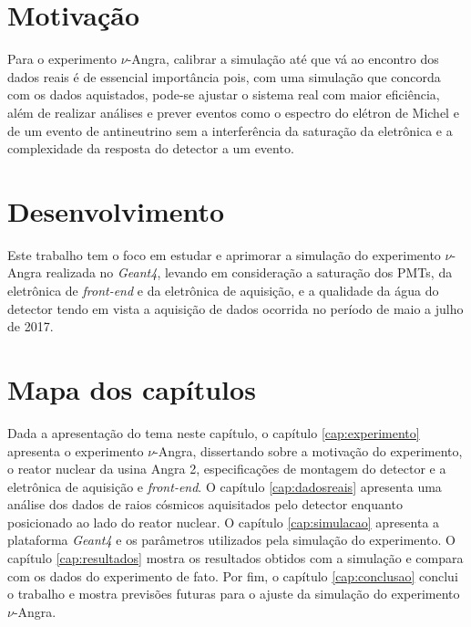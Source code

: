 \section{Motivação} 

Para o experimento $\nu$-Angra, calibrar a simulação até que vá ao encontro dos dados reais é de essencial importância pois, com uma simulação que concorda com os dados aquistados, pode-se ajustar o sistema real com maior eficiência, além de realizar análises e prever eventos como o espectro do elétron de Michel e de um evento de antineutrino sem a interferência da saturação da eletrônica e a complexidade da resposta do detector a um evento. 

\section{Desenvolvimento}

Este trabalho tem o foco em estudar e aprimorar a simulação do experimento $\nu$-Angra realizada no \emph{Geant4}, levando em consideração a saturação dos \ac{PMTs}, da eletrônica de \emph{front-end} e da eletrônica de aquisição, e a qualidade da água do detector tendo em vista a aquisição de dados ocorrida no período de maio a julho de 2017.

\section{Mapa dos capítulos}

Dada a apresentação do tema neste capítulo, o capítulo \ref{cap:experimento} apresenta o experimento $\nu$-Angra, dissertando sobre a motivação do experimento, o reator nuclear da usina Angra 2, especificações de montagem do detector e a eletrônica de aquisição e \emph{front-end}. O capítulo \ref{cap:dadosreais} apresenta uma análise dos dados de raios cósmicos aquisitados pelo detector enquanto posicionado ao lado do reator nuclear. O capítulo \ref{cap:simulacao} apresenta a plataforma \emph{Geant4} e os parâmetros utilizados pela simulação do experimento. O capítulo \ref{cap:resultados} mostra os resultados obtidos com a simulação e compara com os dados do experimento de fato. Por fim, o capítulo \ref{cap:conclusao} conclui o trabalho e mostra previsões futuras para o ajuste da simulação do experimento $\nu$-Angra.